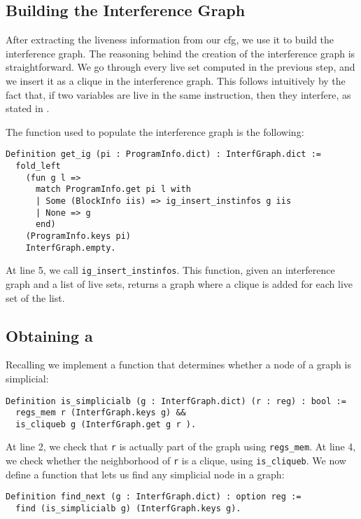 \subsection{Building the Interference Graph}

After extracting the liveness information from our \gls{cfg}, we use it to build the interference graph.
The reasoning behind the creation of the interference graph is straightforward. We go through every live set computed in the previous step, and we insert it as a clique in the interference graph. This follows intuitively by the fact that, if two variables are live in the same instruction, then they interfere, as stated in .

The function used to populate the interference graph is the following:

\begin{lstlisting}[style=Rocq]
Definition get_ig (pi : ProgramInfo.dict) : InterfGraph.dict :=
  fold_left
    (fun g l =>
      match ProgramInfo.get pi l with
      | Some (BlockInfo iis) => ig_insert_instinfos g iis
      | None => g
      end)
    (ProgramInfo.keys pi)
    InterfGraph.empty.
\end{lstlisting}

At line 5, we call \texttt{ig\_insert\_instinfos}. This function, given an interference graph and a list of live sets, returns a graph where a clique is added for each live set of the list.

\subsection{Obtaining a }
\label{subsec:peo}

Recalling  we implement a function that determines whether a node of a graph is simplicial:

\begin{lstlisting}[style=Rocq]
Definition is_simplicialb (g : InterfGraph.dict) (r : reg) : bool :=
  regs_mem r (InterfGraph.keys g) &&
  is_cliqueb g (InterfGraph.get g r ).
\end{lstlisting}

At line 2, we check that \texttt r is actually part of the graph using \texttt{regs\_mem}. At line 4, we check whether the neighborhood of \texttt r is a clique, using \texttt{is\_cliqueb}.
We now define a function that lets us find any simplicial node in a graph:

\begin{lstlisting}[style=Rocq]
Definition find_next (g : InterfGraph.dict) : option reg :=
  find (is_simplicialb g) (InterfGraph.keys g).
\end{lstlisting}

